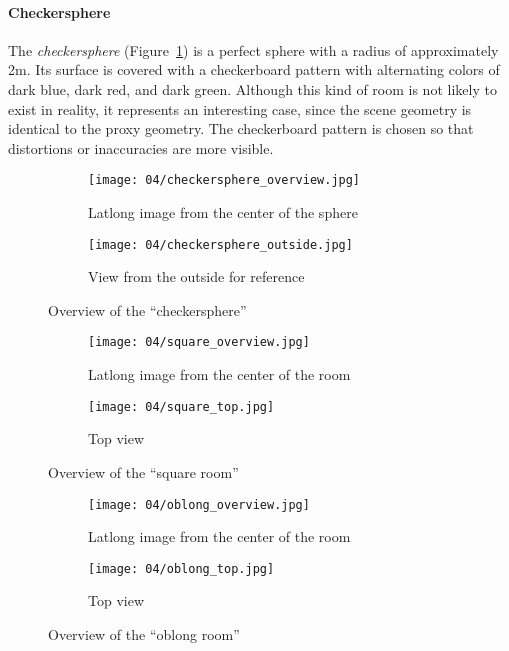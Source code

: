 \paragraph{Checkersphere}
The \emph{checkersphere} (Figure~\ref{fig:checkersphere}) is a perfect sphere with a radius of approximately 2m. Its surface is covered with a checkerboard pattern with alternating colors of dark blue, dark red, and dark green.
Although this kind of room is not likely to exist in reality, it represents an interesting case, since the scene geometry is identical to the proxy geometry. The checkerboard pattern is chosen so that distortions or inaccuracies are more visible.

\begin{figure}[p]
\centering
    \hfill
    \begin{subfigure}[t]{0.7\textwidth}
            \centering
            \texttt{[image: 04/checkersphere\_overview.jpg]}
            \caption{Latlong image from the center of the sphere}
    \end{subfigure}%
    \hfill
    \begin{subfigure}[t]{0.3\textwidth}
            \centering
            \texttt{[image: 04/checkersphere\_outside.jpg]}
            \caption{View from the outside for reference}
    \end{subfigure}
    \hfill
  \caption{Overview of the ``checkersphere''}
  \label{fig:checkersphere}
\end{figure}

\begin{figure}[p]
\centering
    \hfill
    \begin{subfigure}[b]{0.7\textwidth}
            \centering
            \texttt{[image: 04/square\_overview.jpg]}
            \caption{Latlong image from the center of the room}
    \end{subfigure}%
    \hfill
    \begin{subfigure}[b]{0.3\textwidth}
            \centering
            \texttt{[image: 04/square\_top.jpg]}
            \caption{Top view}
    \end{subfigure}
    \hfill
  \caption{Overview of the ``square room''}
  \label{fig:square_room}
\end{figure}

\begin{figure}[p]
\centering
    \hfill
    \begin{subfigure}[b]{0.7\textwidth}
            \centering
            \texttt{[image: 04/oblong\_overview.jpg]}
            \caption{Latlong image from the center of the room}
    \end{subfigure}%
    \hfill
    \begin{subfigure}[b]{0.3\textwidth}
            \centering
            \texttt{[image: 04/oblong\_top.jpg]}
            \caption{Top view}
    \end{subfigure}
    \hfill
  \caption{Overview of the ``oblong room''}
  \label{fig:oblong_room}
\end{figure}

